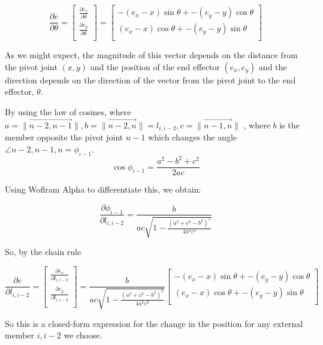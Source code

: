 \documentclass[11pt]{article}
\begin{document}
\[
\frac{\partial e}{\partial \theta} = \begin{bmatrix}
           \frac{\partial e_x}{\partial \theta} \\
           \frac{\partial e_y}{\partial \theta} \\
         \end{bmatrix} = \begin{bmatrix}
           -(e_x  - x) \sin{\theta} + -(e_y -y)\cos{\theta}  \\
           (e_x - x ) \cos{\theta} + -(e_y - y)\sin{\theta}  \\
         \end{bmatrix}
\]

As we might expect, the magnitude of this vector depends on the distance from the pivot joint $(x,y)$ and the position of the end effector
$(e_x,e_y)$ and the direction depends on the direction of the vector from the pivot joint to the end effector, $\theta$.

By using the law of cosines, where $a = \|\overrightarrow{n-2,n-1}\|, b = \|\overrightarrow{n-2,n}\| = l_{i,i-2}, c = \|\overrightarrow{n-1,n}\| $  ,
where $b$ is the member opposite the pivot joint $n-1$ which changes the angle $\angle n-2,n-1,n = \phi_{i-1}$.
\[
\cos{\phi_{i-1}} = \frac{a^2 - b^2 + c^2}{2 a c}
\]

Using Woflram Alpha to differentiate this, we obtain:

\[
\frac{\partial \phi_{i-1}}{\partial l_{i,i-2}} = \frac{b}{ac\sqrt{1 - \frac{(a^2 + c^2 - b^2)^2}{4a^2c^2}}}
\]

So, by the chain rule

\[
\frac{\partial e}{\partial  l_{i,i-2}} = \begin{bmatrix}
           \frac{\partial e_x}{\partial l_{i,i-2}} \\
           \frac{\partial e_y}{\partial l_{i,i-2}} \\
         \end{bmatrix} = \frac{b}{ac\sqrt{1 - \frac{(a^2 + c^2 - b^2)^2}{4a^2c^2}}} \begin{bmatrix}
           -(e_x  - x) \sin{\theta} + -(e_y -y)\cos{\theta}  \\
           (e_x - x ) \cos{\theta} + -(e_y - y)\sin{\theta}  \\
         \end{bmatrix}
\]

So this is a closed-form expression for the change in the position for any external member $i,i-2$ we choose.
\end{document}
